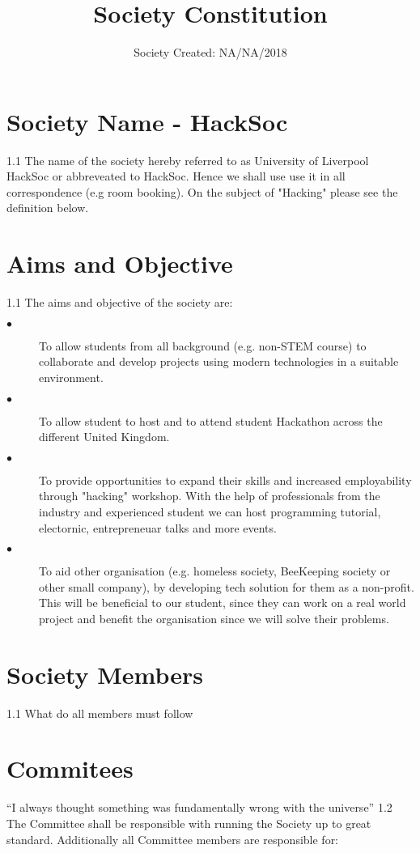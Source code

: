 \documentclass{report}
\title{Society Constitution}
\date{Society Created: NA/NA/2018}
\begin{document}
\maketitle

\section{Society Name - HackSoc}
1.1 The name of the society hereby referred to as University of Liverpool HackSoc or abbreveated to HackSoc. Hence we shall use use it in all correspondence (e.g room booking). On the subject of "Hacking" 
please see the definition below.

\section{Aims and Objective}
1.1 The aims and objective of the society are:
\begin{description}
  \item[$\bullet$] To allow students from all background (e.g. non-STEM course) to collaborate and develop projects using
  modern technologies in a suitable environment.
  \item[$\bullet$] To allow student to host and to attend student Hackathon across the different United Kingdom.
  \item[$\bullet$] To provide opportunities to expand their skills and increased employability
   through "hacking" workshop. With the help of professionals from the industry and experienced student we can host programming tutorial, electornic, entrepreneuar talks and more events.
  \item[$\bullet$] To aid other organisation (e.g. homeless society, BeeKeeping society or other small company), by developing tech solution for them as a non-profit. This will be beneficial to our student, since they can work on a real world project and benefit the organisation since we will solve their problems.
\end{description}


\section{Society Members}
1.1 What do all members must follow

\section{Commitees}
``I always thought something was fundamentally wrong with the universe'' \citep{adams1995hitchhiker}
1.2 The Committee shall be responsible with running the Society up to great standard. Additionally all Committee members are responsible for:
\end{document}
